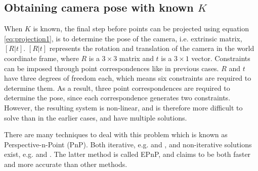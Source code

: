 \subsection{Obtaining camera pose with known $K$} \label{camera-pose}
When $K$ is known, the final step before points can be projected using equation \ref{eq:projection1}, is to determine the pose of the camera, i.e. extrinsic matrix, $[R|t]$. $[R|t]$ represents the rotation and translation of the camera in the world coordinate frame, where $R$ is a $3 \times 3$ matrix and $t$ is a $3 \times 1$ vector.
Constraints can be imposed through point correspondences like in previous cases.
$R$ and $t$ have three degrees of freedom each, which means six constraints are required to determine them.
As a result, three point correspondences are required to determine the pose, since each correspondence generates two constraints.
However, the resulting system is non-linear, and is therefore more difficult to solve than in the earlier cases, and have multiple solutions. \cite[187]{hartley-zisserman}

There are many techniques to deal with this problem which is known as Perspective-n-Point (PnP). 
Both iterative, e.g. \cite{hesch-pnp} and \cite{oberkampf-pnp}, and non-iterative solutions exist, e.g. \cite{quan-pnp} and \cite{lepetit-pnp}.
The latter method is called EPnP, and claims to be both faster and more accurate than other methods. 















